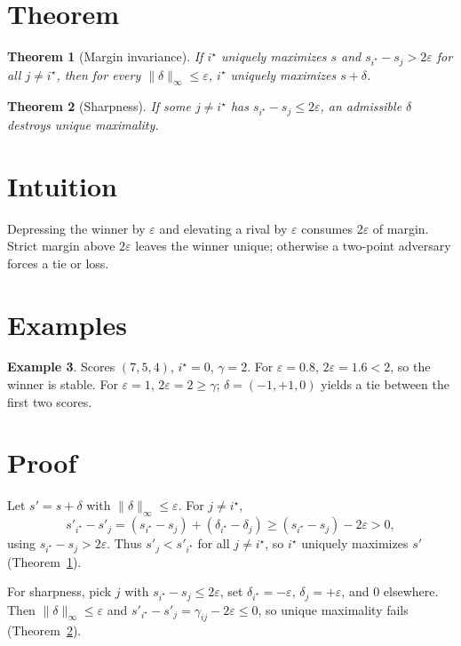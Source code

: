 \documentclass[12pt]{article}
\theoremstyle{plain}
\newtheorem{theorem}{Theorem}
\theoremstyle{definition}
\newtheorem{example}[theorem]{Example}
\theoremstyle{remark}
\begin{document}
\section{Theorem}
\begin{theorem}[Margin invariance]\label{thm:inv}
If $i^\star$ uniquely maximizes $s$ and $s_{i^\star}-s_j>2\varepsilon$ for all $j\neq i^\star$, then for every $\|\delta\|_\infty\le\varepsilon$, $i^\star$ uniquely maximizes $s+\delta$.
\end{theorem}
\begin{theorem}[Sharpness]\label{thm:sharp}
If some $j\neq i^\star$ has $s_{i^\star}-s_j\le 2\varepsilon$, an admissible $\delta$ destroys unique maximality.
\end{theorem}

\section{Intuition}
Depressing the winner by $\varepsilon$ and elevating a rival by $\varepsilon$ consumes $2\varepsilon$ of margin. Strict margin above $2\varepsilon$ leaves the winner unique; otherwise a two-point adversary forces a tie or loss.

\section{Examples}
\begin{example}
Scores $(7,5,4)$, $i^\star=0$, $\gamma=2$. For $\varepsilon=0.8$, $2\varepsilon=1.6<2$, so the winner is stable. For $\varepsilon=1$, $2\varepsilon=2\ge\gamma$; $\delta=(-1,+1,0)$ yields a tie between the first two scores.
\end{example}

\section{Proof}
Let $s'=s+\delta$ with $\|\delta\|_\infty\le\varepsilon$. For $j\neq i^\star$,
\[
s'_{i^\star}-s'_j
=(s_{i^\star}-s_j)+(\delta_{i^\star}-\delta_j)
\ge (s_{i^\star}-s_j)-2\varepsilon
>0,
\]
using $s_{i^\star}-s_j>2\varepsilon$. Thus $s'_j<s'_{i^\star}$ for all $j\neq i^\star$, so $i^\star$ uniquely maximizes $s'$ (Theorem~\ref{thm:inv}).

For sharpness, pick $j$ with $s_{i^\star}-s_j\le 2\varepsilon$, set $\delta_{i^\star}=-\varepsilon$, $\delta_j=+\varepsilon$, and $0$ elsewhere. Then $\|\delta\|_\infty\le\varepsilon$ and $s'_{i^\star}-s'_j=\gamma_{ij}-2\varepsilon\le 0$, so unique maximality fails (Theorem~\ref{thm:sharp}).
\end{document}
